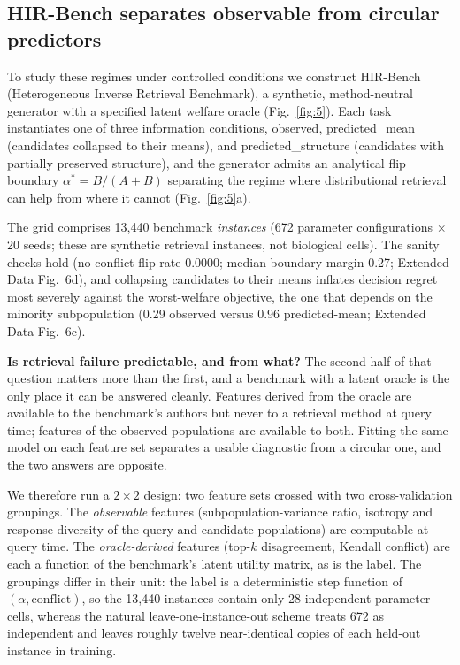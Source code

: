 \documentclass[11pt,letterpaper]{article}
\begin{document}
\subsection*{HIR-Bench separates observable from circular predictors}

To study these regimes under controlled conditions we construct HIR-Bench (Heterogeneous
Inverse Retrieval Benchmark), a synthetic, method-neutral generator with a specified
latent welfare oracle (Fig.~\ref{fig:5}). Each task instantiates one of three information
conditions, observed, predicted\_mean (candidates collapsed to their
means), and predicted\_structure (candidates with partially preserved structure),
and the generator admits an analytical flip boundary $\alpha^* = B/(A+B)$ separating the
regime where distributional retrieval can help from where it cannot (Fig.~\ref{fig:5}a).

The grid comprises 13,440 benchmark \emph{instances} (672 parameter configurations
$\times$ 20 seeds; these are synthetic retrieval instances, not biological cells). The
sanity checks hold (no-conflict flip rate 0.0000; median boundary margin 0.27; Extended
Data Fig.~6d), and collapsing candidates to their means inflates decision regret most
severely against the worst-welfare objective, the one that depends on the minority
subpopulation (0.29 observed versus 0.96 predicted-mean; Extended Data Fig.~6c).

\textbf{Is retrieval failure predictable, and from what?} The second half of that question
matters more than the first, and a benchmark with a latent oracle is the only place it can
be answered cleanly. Features derived from the oracle are available to the benchmark's
authors but never to a retrieval method at query time; features of the observed
populations are available to both. Fitting the same model on each feature set separates a
usable diagnostic from a circular one, and the two answers are opposite.

We therefore run a $2\times2$ design: two feature sets crossed with two cross-validation
groupings. The \emph{observable} features (subpopulation-variance ratio, isotropy and response
diversity of the query and candidate populations) are computable at query time. The
\emph{oracle-derived} features (top-$k$ disagreement, Kendall conflict) are each a function of
the benchmark's latent utility matrix, as is the label. The groupings differ in their unit: the
label is a deterministic step function of $(\alpha, \mathrm{conflict})$, so the 13,440 instances
contain only 28 independent parameter cells, whereas the natural leave-one-instance-out
scheme treats 672 as independent and leaves roughly twelve near-identical copies of each held-out
instance in training.
\end{document}
